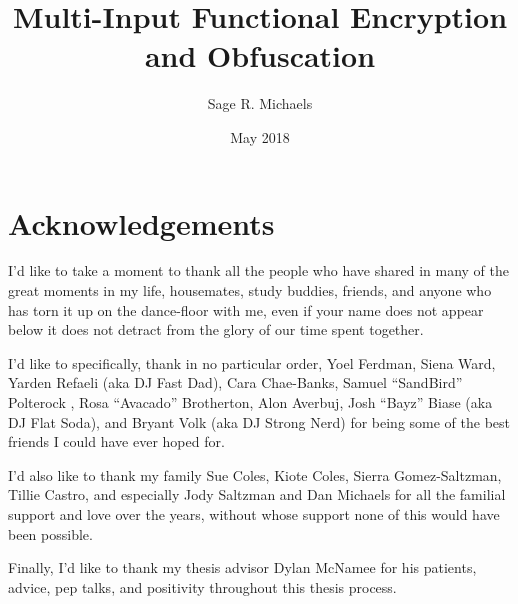 \documentclass[12pt,twoside]{reedthesis}
\title{Multi-Input Functional Encryption and Obfuscation}
\author{Sage R. Michaels}
\date{May 2018}
\begin{document}
  \maketitle
  \frontmatter %
  \pagestyle{empty} %

    \chapter*{Acknowledgements}
	
		
	I'd like to take a moment to thank all the people who have shared in many of the great moments in my life, housemates, study buddies, friends, and anyone who has torn it up on the dance-floor with me, even if your name does not appear below it does not detract from the glory of our time spent together. 
	\par I'd like to specifically, thank in no particular order, Yoel Ferdman,  Siena Ward, Yarden Refaeli (aka DJ Fast Dad), Cara Chae-Banks, Samuel ``SandBird'' Polterock , Rosa ``Avacado'' Brotherton, Alon Averbuj, Josh ``Bayz'' Biase (aka DJ Flat Soda), and Bryant Volk (aka DJ Strong Nerd) for being some of the best friends I could have ever hoped for.	
	\par I'd also like to thank my family Sue Coles, Kiote Coles, Sierra Gomez-Saltzman, Tillie Castro, and especially Jody Saltzman and Dan Michaels for all the familial support and love over the years, without whose support none of this would have been possible.
	\par Finally, I'd like to thank my thesis advisor Dylan McNamee for his patients, advice, pep talks, and positivity throughout this thesis process.


\end{document}
